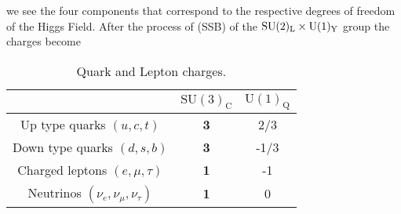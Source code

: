 %
%
 we see the four components that correspond to the respective degrees of freedom of the Higgs Field.
% 
After the process of  (SSB) of the $\mathrm{SU(2)_L} \times \mathrm{U}(1)_{\mathrm{Y}}$ group the charges  become 
%
\begin{table}[H]\label{tab:Charges_post_SSB}
	\caption{Quark and Lepton charges. }
	\centering
	\begin{tabular}{ccc}
		\hline & $\mathrm{SU(3)_C}$ & $\mathrm{U(1)_Q}$ \\
		\hline 
		Up type quarks $(u,c,t)$ & \textbf{3} & 2/3 \\
		Down type quarks $(d,s,b)$ & \textbf{3} & -1/3 \\
		Charged leptons $(e,\mu,\tau)$ & \textbf{1} & -1 \\
		Neutrinos  $(\nu_e,\nu_\mu,\nu_\tau)$  & \textbf{1} & 0 \\
		\hline	
	\end{tabular}
\end{table}

